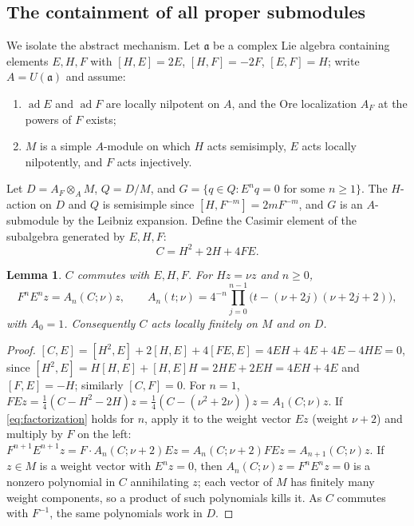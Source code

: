 \documentclass[11pt,a4paper]{article}
\newcommand{\ad}{\operatorname{ad}}
\newtheorem{lemma}[theorem]{Lemma}
\begin{document}
\subsection{The containment of all proper submodules}
\label{sec:abstract}

We isolate the abstract mechanism. Let $\mathfrak a$ be a complex Lie
algebra containing elements $E,H,F$ with
$[H,E]=2E$, $[H,F]=-2F$, $[E,F]=H$; write $A=U(\mathfrak a)$ and assume:
\begin{enumerate}[label=(\roman*)]
\item $\ad E$ and $\ad F$ are locally nilpotent on $A$, and the Ore
localization $A_F$ at the powers of $F$ exists;
\item $M$ is a simple $A$-module on which $H$ acts semisimply, $E$ acts
locally nilpotently, and $F$ acts injectively.
\end{enumerate}
Let $D=A_F\otimes_AM$, $Q=D/M$, and
$G=\{q\in Q:E^nq=0\text{ for some }n\ge1\}$. The $H$-action on $D$ and
$Q$ is semisimple since $[H,F^{-m}]=2mF^{-m}$, and $G$ is an $A$-submodule
by the Leibniz expansion. Define the Casimir element of the subalgebra
generated by $E,H,F$:
\begin{equation}\label{eq:C}
 C=H^2+2H+4FE.
\end{equation}
\begin{lemma}\label{lem:casimir}
$C$ commutes with $E,H,F$. For $Hz=\nu z$ and $n\ge0$,
\begin{equation}\label{eq:factorization}
 F^nE^nz=A_n(C;\nu)z,\qquad
 A_n(t;\nu)=4^{-n}\prod_{j=0}^{n-1}
 \bigl(t-(\nu+2j)(\nu+2j+2)\bigr),
\end{equation}
with $A_0=1$. Consequently $C$ acts locally finitely on $M$ and on $D$.
\end{lemma}
\begin{proof}
$[C,E]=[H^2,E]+2[H,E]+4[FE,E]=4EH+4E+4E-4HE=0$, since
$[H^2,E]=H[H,E]+[H,E]H=2HE+2EH=4EH+4E$ and $[F,E]=-H$; similarly
$[C,F]=0$. For $n=1$,
$FEz=\tfrac14(C-H^2-2H)z=\tfrac14(C-(\nu^2+2\nu))z=A_1(C;\nu)z$.
If \eqref{eq:factorization} holds for $n$, apply it to the weight vector
$Ez$ (weight $\nu+2$) and multiply by $F$ on the left:
$F^{n+1}E^{n+1}z=F\cdot A_n(C;\nu+2)Ez=A_n(C;\nu+2)FEz
=A_{n+1}(C;\nu)z$. If $z\in M$ is a weight vector with $E^nz=0$, then
$A_n(C;\nu)z=F^nE^nz=0$ is a nonzero polynomial in $C$ annihilating $z$;
each vector of $M$ has finitely many weight components, so a product of
such polynomials kills it. As $C$ commutes with $F^{-1}$, the same
polynomials work in $D$.
\end{proof}
\end{document}
